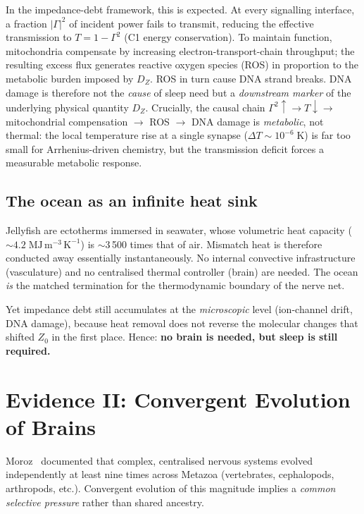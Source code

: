 ﻿\documentclass[aps,pre,twocolumn,superscriptaddress,floatfix]{revtex4-2}
\begin{document}
In the impedance-debt framework, this is expected.
At every signalling interface, a fraction $|\Gamma|^2$
of incident power fails to transmit, reducing the
effective transmission to $T = 1 - \Gamma^2$ (C1 energy
conservation).
To maintain function, mitochondria compensate by
increasing electron-transport-chain throughput;
the resulting excess flux generates reactive oxygen
species (ROS) in proportion to the metabolic burden
imposed by $D_Z$.
ROS in turn cause DNA strand breaks.
DNA damage is therefore not the \emph{cause} of sleep need
but a \emph{downstream marker} of the underlying
physical quantity $D_Z$.
Crucially, the causal chain
$\Gamma^2{\uparrow} \to T{\downarrow} \to$
mitochondrial compensation $\to$ ROS $\to$ DNA damage
is \emph{metabolic}, not thermal:
the local temperature rise at a single synapse
($\Delta T \sim 10^{-6}\;$K) is far too small for
Arrhenius-driven chemistry, but the transmission
deficit forces a measurable metabolic response.

\subsection{The ocean as an infinite heat sink}
\label{sec:ocean-heat-sink}

Jellyfish are ectotherms immersed in seawater,
whose volumetric heat capacity
($\sim 4.2\;\mathrm{MJ\,m^{-3}\,K^{-1}}$)
is $\sim$3\,500 times that of air.
Mismatch heat is therefore conducted away essentially
instantaneously.
No internal convective infrastructure (vasculature)
and no centralised thermal controller (brain) are needed.
The ocean \emph{is} the matched termination for the
thermodynamic boundary of the nerve net.

Yet impedance debt still accumulates at the
\emph{microscopic} level (ion-channel drift, DNA damage),
because heat removal does not reverse the molecular
changes that shifted $Z_0$ in the first place.
Hence: \textbf{no brain is needed, but sleep is still required.}


\section{Evidence II: Convergent Evolution of Brains}
\label{sec:brains}

Moroz~\cite{Moroz2012} documented that complex,
centralised nervous systems evolved independently
at least nine times across Metazoa
(vertebrates, cephalopods, arthropods, etc.).
Convergent evolution of this magnitude implies a
\emph{common selective pressure} rather than shared ancestry.
\end{document}
